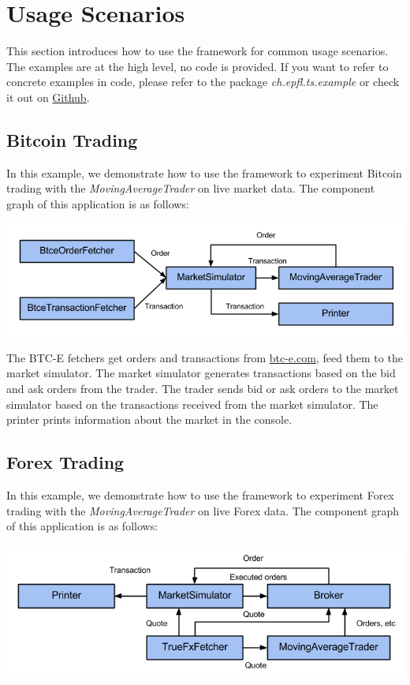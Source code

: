 
\section{Usage Scenarios}
\label{sec:3}

This section introduces how to use the framework for common usage scenarios. The examples are at the high level, no code is provided. If you want to refer to concrete examples in code, please refer to the package \emph{ch.epfl.ts.example} or check it out on \href{https://github.com/merlinND/TradingSimulation/tree/master/ts/src/main/scala/ch/epfl/ts/example}{Github}.

\subsection{Bitcoin Trading}

In this example, we demonstrate how to use the framework to experiment Bitcoin trading with the \emph{MovingAverageTrader} on live market data. The component graph of this application is as follows:

\noindent
\includegraphics[width=\textwidth]{img/examples/btce}

The BTC-E fetchers get orders and transactions from \url{btc-e.com}, feed them to the market simulator. The market simulator generates transactions based on the bid and ask orders from the trader. The trader sends bid or ask orders to the market simulator based on the transactions received from the market simulator. The printer prints information about the market in the console.

\subsection{Forex Trading}

In this example, we demonstrate how to use the framework to experiment Forex trading with the \emph{MovingAverageTrader} on live Forex data. The component graph of this application is as follows:

\noindent
\includegraphics[width=\textwidth]{img/examples/forex-live}

